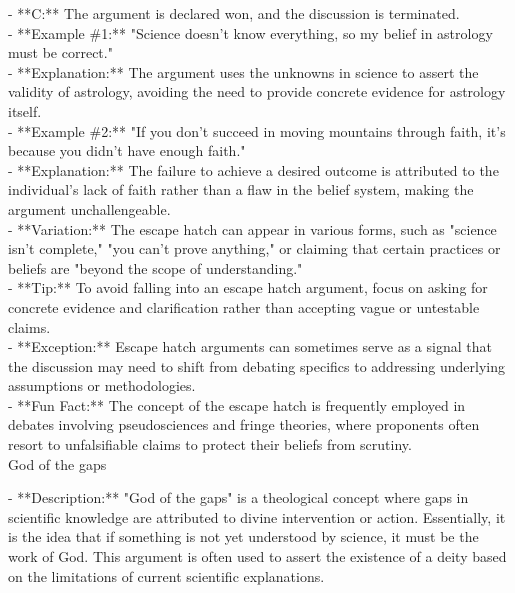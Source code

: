 \documentclass[a4paper,12pt,single,pdftex]{scrartcl}
\begin{document}
    
        - **C:** The argument is declared won, and the discussion is terminated.
    \\

    
      - **Example \#1:** "Science doesn’t know everything, so my belief in astrology must be correct."
    \\

    
      - **Explanation:** The argument uses the unknowns in science to assert the validity of astrology, avoiding the need to provide concrete evidence for astrology itself.
    \\

    
      - **Example \#2:** "If you don’t succeed in moving mountains through faith, it’s because you didn’t have enough faith."
    \\

    
      - **Explanation:** The failure to achieve a desired outcome is attributed to the individual's lack of faith rather than a flaw in the belief system, making the argument unchallengeable.
    \\

    
      - **Variation:** The escape hatch can appear in various forms, such as "science isn’t complete," "you can’t prove anything," or claiming that certain practices or beliefs are "beyond the scope of understanding."
    \\

    
      - **Tip:** To avoid falling into an escape hatch argument, focus on asking for concrete evidence and clarification rather than accepting vague or untestable claims.
    \\

    
      - **Exception:** Escape hatch arguments can sometimes serve as a signal that the discussion may need to shift from debating specifics to addressing underlying assumptions or methodologies.
    \\

    
      - **Fun Fact:** The concept of the escape hatch is frequently employed in debates involving pseudosciences and fringe theories, where proponents often resort to unfalsifiable claims to protect their beliefs from scrutiny.
    \\

  

God of the gaps
    
      - **Description:** "God of the gaps" is a theological concept where gaps in scientific knowledge are attributed to divine intervention or action. Essentially, it is the idea that if something is not yet understood by science, it must be the work of God. This argument is often used to assert the existence of a deity based on the limitations of current scientific explanations.
    \\
\end{document}

